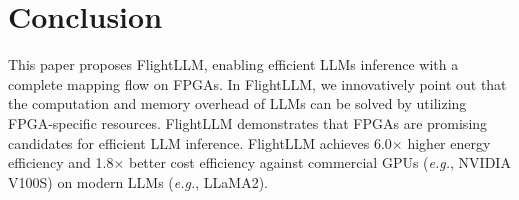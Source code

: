 \documentclass[sigconf]{acmart}
\begin{document}



\maketitle






% 














\vspace{-5pt}
\section{Conclusion}
This paper proposes FlightLLM, enabling efficient LLMs inference with a complete mapping flow on FPGAs. 
In FlightLLM, we innovatively point out that the computation and memory overhead of LLMs can be solved by utilizing FPGA-specific resources. FlightLLM demonstrates that FPGAs are promising candidates for efficient LLM inference. FlightLLM achieves 6.0$\times$ higher energy efficiency and 1.8$\times$ better cost efficiency against commercial GPUs (\textit{e.g.}, NVIDIA V100S) on modern LLMs (\textit{e.g.}, LLaMA2). 
\end{document}
